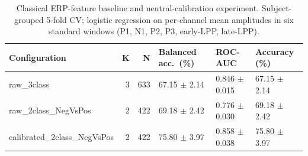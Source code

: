 \begin{table}[t]
  \centering
  \caption{Classical ERP-feature baseline and neutral-calibration experiment. Subject-grouped 5-fold CV; logistic regression on per-channel mean amplitudes in six standard windows (P1, N1, P2, P3, early-LPP, late-LPP).}
  \label{tab:erp_neutral_calibration}
  \begin{tabular}{lrrlll}
    \toprule
      Configuration & K & N & Balanced acc.\ (\%) & ROC-AUC & Accuracy (\%) \\
    \midrule
      raw\_3class          & 3 &   633 &  67.15 $\pm$ 2.14 &  0.846 $\pm$ 0.015 &  67.15 $\pm$ 2.14 \\
      raw\_2class\_NegVsPos & 2 &   422 &  69.18 $\pm$ 2.42 &  0.776 $\pm$ 0.030 &  69.18 $\pm$ 2.42 \\
      calibrated\_2class\_NegVsPos & 2 &   422 &  75.80 $\pm$ 3.97 &  0.858 $\pm$ 0.038 &  75.80 $\pm$ 3.97 \\
    \bottomrule
  \end{tabular}
\end{table}
